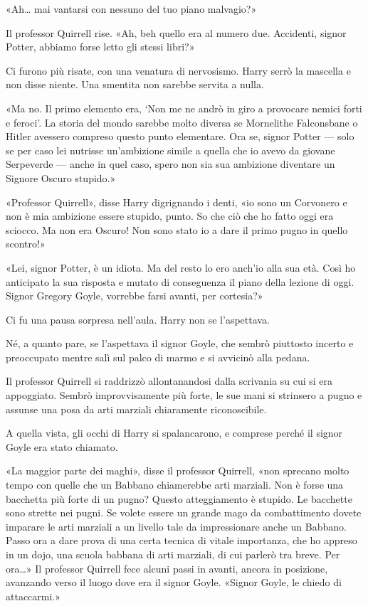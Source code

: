 «Ah… mai vantarsi con nessuno del tuo piano malvagio?»

Il professor Quirrell rise. «Ah, beh quello era al numero due. Accidenti, signor Potter, abbiamo forse letto gli stessi libri?»

Ci furono più risate, con una venatura di nervosismo. Harry serrò la mascella e non disse niente. Una smentita non sarebbe servita a nulla.

«Ma no. Il primo elemento era, ‘Non me ne andrò in giro a provocare nemici forti e feroci’. La storia del mondo sarebbe molto diversa se Mornelithe Falconsbane o Hitler avessero compreso questo punto elementare. Ora se, signor Potter — solo se per caso lei nutrisse un’ambizione simile a quella che io avevo da giovane Serpeverde — anche in quel caso, spero non sia sua ambizione diventare un Signore Oscuro stupido.»

«Professor Quirrell», disse Harry digrignando i denti, «io sono un Corvonero e non è mia ambizione essere stupido, punto. So che ciò che ho fatto oggi era sciocco. Ma non era Oscuro! Non sono stato io a dare il primo pugno in quello scontro!»

«Lei, signor Potter, è un idiota. Ma del resto lo ero anch’io alla sua età. Così ho anticipato la sua risposta e mutato di conseguenza il piano della lezione di oggi. Signor Gregory Goyle, vorrebbe farsi avanti, per cortesia?»

Ci fu una pausa sorpresa nell’aula. Harry non se l’aspettava.

Né, a quanto pare, se l’aspettava il signor Goyle, che sembrò piuttosto incerto e preoccupato mentre salì sul palco di marmo e si avvicinò alla pedana.

Il professor Quirrell si raddrizzò allontanandosi dalla scrivania su cui si era appoggiato. Sembrò improvvisamente più forte, le sue mani si strinsero a pugno e assunse una posa da arti marziali chiaramente riconoscibile.

A quella vista, gli occhi di Harry si spalancarono, e comprese perché il signor Goyle era stato chiamato.

«La maggior parte dei maghi», disse il professor Quirrell, «non sprecano molto tempo con quelle che un Babbano chiamerebbe arti marziali. Non è forse una bacchetta più forte di un pugno? Questo atteggiamento è stupido. Le bacchette sono strette nei pugni. Se volete essere un grande mago da combattimento dovete imparare le arti marziali a un livello tale da impressionare anche un Babbano. Passo ora a dare prova di una certa tecnica di vitale importanza, che ho appreso in un dojo, una scuola babbana di arti marziali, di cui parlerò tra breve. Per ora…» Il professor Quirrell fece alcuni passi in avanti, ancora in posizione, avanzando verso il luogo dove era il signor Goyle. «Signor Goyle, le chiedo di attaccarmi.»

